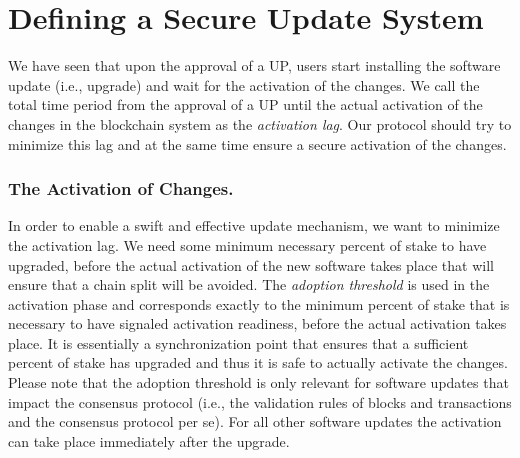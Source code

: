 \section{Defining a Secure Update System} \label{secureupdate}
We have seen that upon the approval of a UP, users start installing the software update (i.e., upgrade) and wait for the activation of the changes. We call the total  time period from the approval of a UP until the actual activation of the changes in the blockchain system as the \emph{activation lag}. Our protocol should try to minimize this lag and at the same time ensure a secure activation of the changes.


\subsubsection{The Activation of Changes.}\label{se:informal}
In order to enable a swift and effective update mechanism, we want to minimize the activation lag. 
We need some minimum necessary percent of stake to have upgraded, before the actual activation of the new software takes place that will ensure that a chain split will be avoided. The \emph{adoption threshold} is used in the activation phase and corresponds exactly to the minimum percent of stake that is necessary to have signaled activation readiness, before the actual activation takes place. It is essentially a synchronization point that ensures that a sufficient percent of stake has upgraded and thus it is safe to actually activate the changes. 
 Please note that the adoption threshold is only relevant for software updates that impact the consensus protocol (i.e., the validation rules of blocks and transactions and the consensus protocol per se). For all other software updates the activation can take place immediately after the upgrade.

